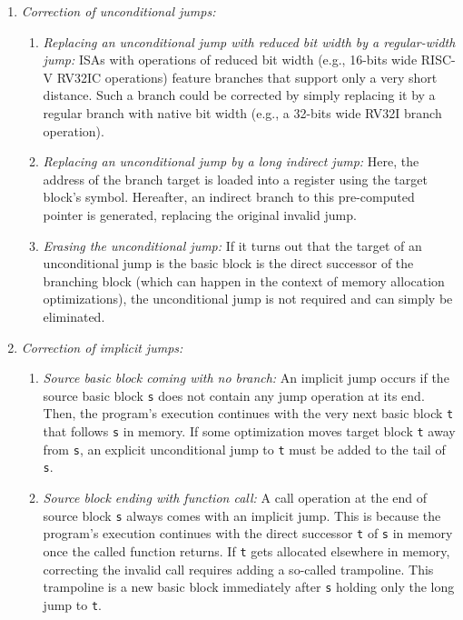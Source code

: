 \begin{enumerate}
  \item \emph{Correction of unconditional jumps:}
    \begin{enumerate}
      \item \emph{Replacing an unconditional jump with reduced bit width by a regular-width jump:}\label{enum:ucondwidth} \glspl{ISA} with operations of reduced bit width (e.g., 16-bits wide RISC-V RV32IC operations) feature branches that support only a very short distance.
      Such a branch could be corrected by simply replacing it by a regular branch with native bit width (e.g., a 32-bits wide RV32I branch operation).

      \item \emph{Replacing an unconditional jump by a long indirect jump:} Here, the address of the branch target is loaded into a register using the target block's symbol.
      Hereafter, an indirect branch to this pre-computed pointer is generated, replacing the original invalid jump.

      \item \emph{Erasing the unconditional jump:} If it turns out that the target of an unconditional jump is the basic block is the direct successor of the branching block (which can happen in the context of memory allocation optimizations), the unconditional jump is not required and can simply be eliminated.
    \end{enumerate}

  \item \emph{Correction of implicit jumps:}
    \begin{enumerate}
      \item \emph{Source basic block coming with no branch:}\label{enum:implnobranch} An implicit jump occurs if the source basic block \texttt{s} does not contain any jump operation at its end.
      Then, the program's execution continues with the very next basic block \texttt{t} that follows \texttt{s} in memory.
      If some optimization moves target block \texttt{t} away from \texttt{s}, an explicit unconditional jump to \texttt{t} must be added to the tail of \texttt{s}.

      \item \emph{Source block ending with function call:}\label{enum:implcall} A call operation at the end of source block \texttt{s} always comes with an implicit jump. This is because the program's execution continues with the direct successor \texttt{t} of \texttt{s} in memory once the called function returns.
      If \texttt{t} gets allocated elsewhere in memory, correcting the invalid call requires adding a so-called trampoline.
      This trampoline is a new basic block immediately after \texttt{s} holding only the long jump to \texttt{t}.
    \end{enumerate}


\end{enumerate}
